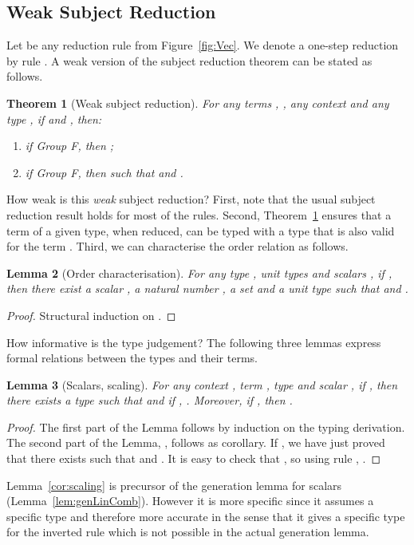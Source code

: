 \documentclass[colorlinks=true,linkcolor=black,urlcolor=black,citecolor=blue,submission,copyright,creativecommons]{eptcs}
\newtheorem{theorem}{Theorem}[section]
\newtheorem{lemma}[theorem]{Lemma}
\begin{document}
\subsection{Weak Subject Reduction}
Let  be any reduction rule from Figure~\ref{fig:Vec}. We denote  a one-step reduction by rule .
A weak version of the subject reduction theorem can be stated as follows.
\begin{theorem}[Weak subject reduction]\label{thm:subjectreduction}
  For any terms , , any context  and any type
  , if  and , then:
  \begin{enumerate}
   \item if  Group F, then ;
   \item if  Group F, then
    such that  and
   .
  \end{enumerate}
\end{theorem}

\noindent How weak is this {\em weak} subject reduction? First, note that the usual subject
reduction result holds for most of the rules. 
Second, Theorem~\ref{thm:subjectreduction} ensures that a term  of a
given type, when reduced, can be typed with a type that is also valid
for the term . 
Third, we can characterise the order relation as follows.
\begin{lemma}[Order characterisation]\label{lem:orderchar} For any type , unit types   and scalars , if , then there exist a scalar , a natural number , a set  and a unit type  such that  and .
\end{lemma}
\begin{proof}
 Structural induction on .
\end{proof}


How informative is the type judgement? The following three lemmas express formal relations between the types and their terms.

\begin{lemma}[Scalars, scaling]\label{lem:scalars}\label{cor:scaling}
  For any context , term , type  and scalar
  , if , then there
  exists a type  such that  and if
  , .  Moreover, if
  , then
  .
\end{lemma}
\begin{proof}
 The first part of the Lemma follows by induction on the typing derivation.
The second part of the Lemma, , follows as corollary. If , we have just proved that there exists  such that  and . It is easy to check that , so using rule , .
\end{proof}


Lemma~\ref{cor:scaling} is precursor of the generation lemma for
scalars (Lemma~\ref{lem:genLinComb}). However it is more specific since it
assumes a specific type and therefore more accurate in the sense that
it gives a specific type for the inverted rule which is not possible
in the actual generation lemma. 
\end{document}
